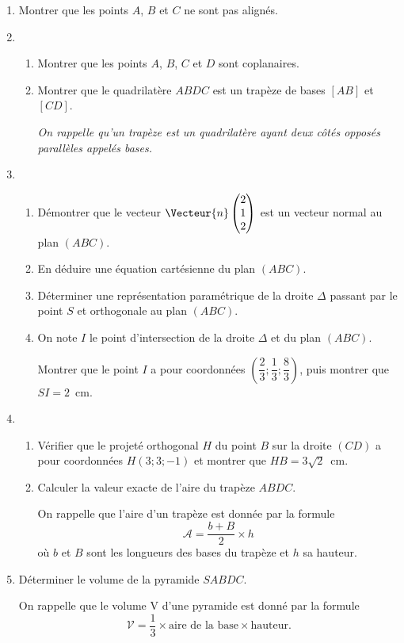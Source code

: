 \begin{enumerate}
	\item Montrer que les points $A$, $B$ et $C$ ne sont pas alignés.
	\item 
	\begin{enumerate}
		\item Montrer que les points $A$, $B$, $C$ et $D$ sont coplanaires.
		\item Montrer que le quadrilatère $ABDC$ est un trapèze de bases $[AB]$ et $[CD]$.
		
		\emph{On rappelle qu’un trapèze est un quadrilatère ayant deux côtés opposés parallèles appelés bases.}
	\end{enumerate}
	\item 
	\begin{enumerate}
		\item Démontrer que le vecteur $\Vecteur{n}\begin{pmatrix}2\\1\\2\end{pmatrix}$ est un vecteur normal au plan $(ABC)$.
		\item En déduire une équation cartésienne du plan $(ABC)$.
		\item Déterminer une représentation paramétrique de la droite $\Delta$ passant par le point $S$ et orthogonale au plan $(ABC)$.
		\item On note $I$ le point d’intersection de la droite $\Delta$ et du plan $(ABC)$.
		
		Montrer que le point $I$ a pour coordonnées $\left(\dfrac23;\dfrac13;\dfrac83\right)$, puis montrer que $SI = 2$~cm.
	\end{enumerate}
	\item 
	\begin{enumerate}
		\item Vérifier que le projeté orthogonal $H$ du point $B$ sur la droite $(CD)$ a pour coordonnées $H(3;3;-1)$ et montrer que $HB = 3\sqrt{2}$~cm.
		\item Calculer la valeur exacte de l’aire du trapèze $ABDC$.
		
		On rappelle que l’aire d’un trapèze est donnée par la formule \[ \mathcal{A} = \frac{b+B}{2} \times h \]
		où $b$ et $B$ sont les longueurs des bases du trapèze et $h$ sa hauteur.
	\end{enumerate}
	\item Déterminer le volume de la pyramide $SABDC$.
	
	On rappelle que le volume V d’une pyramide est donné par la formule \[ \mathcal{V} = \frac13 \times \text{aire de la base} \times \text{hauteur}. \]
\end{enumerate}